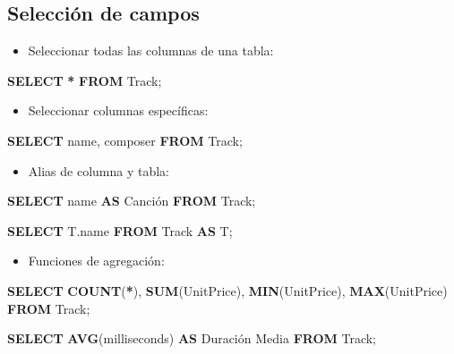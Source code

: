 \documentclass[
]{book}
\newenvironment{Shaded}{\begin{snugshade}}{\end{snugshade}}
\newcommand{\FunctionTok}[1]{\textcolor[rgb]{0.13,0.29,0.53}{\textbf{#1}}}
\newcommand{\KeywordTok}[1]{\textcolor[rgb]{0.13,0.29,0.53}{\textbf{#1}}}
\newcommand{\NormalTok}[1]{#1}
\newcommand{\OperatorTok}[1]{\textcolor[rgb]{0.81,0.36,0.00}{\textbf{#1}}}
\newcommand{\StringTok}[1]{\textcolor[rgb]{0.31,0.60,0.02}{#1}}
\providecommand{\tightlist}{%
  \setlength{\itemsep}{0pt}\setlength{\parskip}{0pt}}
\theoremstyle{break}
\theoremstyle{nonumberplain}
\begin{document}
\subsection{Selección de campos}\label{selecciuxf3n-de-campos}

\begin{itemize}
\tightlist
\item
  Seleccionar todas las columnas de una tabla:
\end{itemize}

\begin{Shaded}
\begin{Highlighting}[]
  \KeywordTok{SELECT} \OperatorTok{*} \KeywordTok{FROM}\NormalTok{ Track;  }
\end{Highlighting}
\end{Shaded}

\begin{itemize}
\tightlist
\item
  Seleccionar columnas específicas:
\end{itemize}

\begin{Shaded}
\begin{Highlighting}[]
  \KeywordTok{SELECT}\NormalTok{ name, composer }\KeywordTok{FROM}\NormalTok{ Track; }
\end{Highlighting}
\end{Shaded}

\begin{itemize}
\tightlist
\item
  Alias de columna y tabla:
\end{itemize}

\begin{Shaded}
\begin{Highlighting}[]
  \KeywordTok{SELECT}\NormalTok{ name }\KeywordTok{AS}\NormalTok{ Canción }\KeywordTok{FROM}\NormalTok{ Track; }

  \KeywordTok{SELECT}\NormalTok{ T.name }\KeywordTok{FROM}\NormalTok{ Track }\KeywordTok{AS}\NormalTok{ T;}
\end{Highlighting}
\end{Shaded}

\begin{itemize}
\tightlist
\item
  Funciones de agregación:
\end{itemize}

\begin{Shaded}
\begin{Highlighting}[]
  \KeywordTok{SELECT} \FunctionTok{COUNT}\NormalTok{(}\OperatorTok{*}\NormalTok{), }\FunctionTok{SUM}\NormalTok{(UnitPrice), }\FunctionTok{MIN}\NormalTok{(UnitPrice), }\FunctionTok{MAX}\NormalTok{(UnitPrice) }\KeywordTok{FROM}\NormalTok{ Track; }

  \KeywordTok{SELECT} \FunctionTok{AVG}\NormalTok{(milliseconds) }\KeywordTok{AS} \StringTok{\textquotesingle{}Duración Media\textquotesingle{}} \KeywordTok{FROM}\NormalTok{ Track; }
\end{Highlighting}
\end{Shaded}
\end{document}
